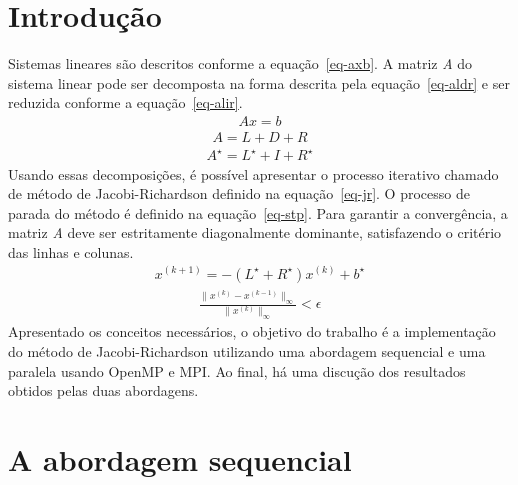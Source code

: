 \documentclass[a4paper]{article}
\begin{document}
\section{Introdução}
\indent \indent Sistemas lineares são descritos conforme a equação~\ref{eq-axb}. A matriz \emph{A} do sistema linear pode ser decomposta na forma descrita pela equação~\ref{eq-aldr} e ser reduzida conforme a equação~\ref{eq-alir}.
\begin{eqnarray} \label{eq-axb}
	Ax = b
\end{eqnarray}
\begin{eqnarray} \label{eq-aldr}
	A = L + D + R
\end{eqnarray}
\begin{eqnarray} \label{eq-alir}
	A^\star = L^\star + I + R^\star 
\end{eqnarray}
\indent Usando essas decomposições, é possível apresentar o processo iterativo chamado de método de Jacobi-Richardson definido na equação~\ref{eq-jr}. O processo de parada do método é definido na equação~\ref{eq-stp}. Para garantir a convergência, a matriz \emph{A} deve ser estritamente diagonalmente dominante, satisfazendo o critério das linhas e colunas.
\begin{eqnarray} \label{eq-jr}
	x^{(k+1)} = -(L^\star + R^\star)x^{(k)} + b^\star
\end{eqnarray}
\begin{eqnarray} \label{eq-stp}
	\frac{\parallel x^{(k)} - x^{(k-1)}\parallel_\infty}{\parallel x^{(k)}\parallel_\infty} < \epsilon
\end{eqnarray}
\indent Apresentado os conceitos necessários, o objetivo do trabalho é a implementação do método de Jacobi-Richardson utilizando uma abordagem sequencial e uma paralela usando OpenMP e MPI. Ao final, há uma discução dos resultados obtidos pelas duas abordagens.
\section{A abordagem sequencial}
\end{document}
